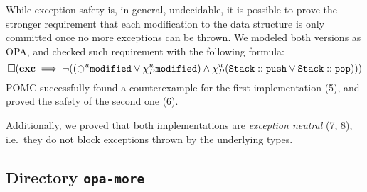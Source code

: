 \documentclass[9pt,a4paper]{article}
\begin{document}
While exception safety is, in general, undecidable, it is possible to
prove the stronger requirement that each modification to the data
structure is only committed once no more exceptions can be thrown.
We modeled both versions as OPA, and checked
such requirement with the following formula:
\[
\square (\mathbf{exc} \implies
         \neg ((\circleddash^u \mathtt{modified} \lor
               \chi_P^{u} \mathtt{modified})
         \land \chi_P^{u} (\mathtt{Stack::push} \lor \mathtt{Stack::pop})))
\]
POMC successfully found a counterexample for the first implementation (5),
and proved the safety of the second one (6).

Additionally, we proved that both implementations are
\emph{exception neutral} (7, 8), i.e.\ they do not block exceptions
thrown by the underlying types.


\subsection{Directory \texttt{opa-more}}
\end{document}
